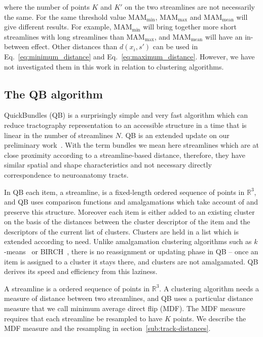 \documentclass{bioinfo}
\begin{document}
\begin{methods}
\noindent
where the number of points $K$ and $K'$ on the two streamlines are not
necessarily the same. For the same threshold value
$\textrm{MAM}_{\textrm{min}}$, $\textrm{MAM}_{\textrm{max}}$ and
$\textrm{MAM}_{\textrm{mean}}$ will give different results. For example,
$\textrm{MAM}_{\textrm{min}}$ will bring together more short streamlines
with long streamlines than $\textrm{MAM}_{\textrm{max}}$, and
$\textrm{MAM}_{\textrm{mean}}$ will have an in-between effect.  Other
distances than $d(x_{i},s')$ can be used in
Eq.~\ref{eq:minimum_distance} and Eq.~\ref{eq:maximum_distance}.
However, we have not investigated them in this work in relation to
clustering algorithms.

\subsection{The QB algorithm\label{sub:QB-description}}

QuickBundles (QB) is a surprisingly simple and very fast algorithm which
can reduce tractography representation to an accessible structure in a
time that is linear in the number of streamlines $N$. QB is an extended
update on our preliminary work~\citet{EGMB10}. With the term bundles we mean here streamlines which are at close proximity according to a streamline-based distance, therefore, they have similar spatial and shape characteristics and not necessary directly correspondence to neuroanatomy tracts.

In QB each item, a streamline, is a fixed-length ordered sequence of
points in $\mathbb{R}^{3}$, and QB uses comparison functions and
amalgamations which take account of and preserve this structure.
Moreover each item is either added to an existing cluster on the basis
of the distances between the cluster descriptor of the item and the
descriptors of the current list of clusters. Clusters are held in a list
which is extended according to need. Unlike amalgamation clustering
algorithms such as $k$-means~\citep{steinhaus1956division,
  macqueen1967some} or BIRCH~\citep{zhang1997birch}, there is no
reassignment or updating phase in QB -- once an item is assigned to a
cluster it stays there, and clusters are not amalgamated. QB derives its
speed and efficiency from this laziness.

A streamline is a ordered sequence of points in $\mathbb{R}^{3}$.  A
clustering algorithm needs a measure of distance between two
streamlines, and QB uses a particular distance measure that we call
minimum average direct flip (MDF).  The MDF measure requires that each
streamline be resampled to have $K$ points. We describe the MDF measure
and the resampling in section~\ref{sub:track-distances}.


\end{methods}
\end{document}
